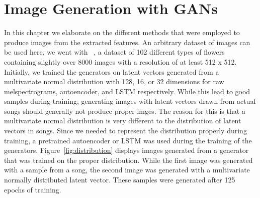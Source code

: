 \chapter{Image Generation with GANs}\label{ch:generation}
    In this chapter we elaborate on the different methods that were employed to produce images from the extracted features. An arbitrary dataset of images can be used here, we went with ~\cite{102flower}, a dataset of 102 different types of flowers containing slightly over 8000 images with a resolution of at least 512 x 512.\\
    Initially, we trained the generators on latent vectors generated from a multivariate normal distribution with 128, 16, or 32 dimensions for raw melspectrograms, autoencoder, and LSTM respectively. While this lead to good samples during training, generating images with latent vectors drawn from actual songs should generally not produce proper imges. The reason for this is that a multivariate normal distribution is very different to the distribution of latent vectors in songs. Since we needed to represent the distribution properly during training, a pretrained autoencoder or LSTM was used during the training of the generators. Figure~\ref{fig:distribution} displays images generated from a generator that was trained on the proper distribution. While the first image was generated with a sample from a song, the second image was generated with a multivariate normally distributed latent vector. These samples were generated after 125 epochs of training.

